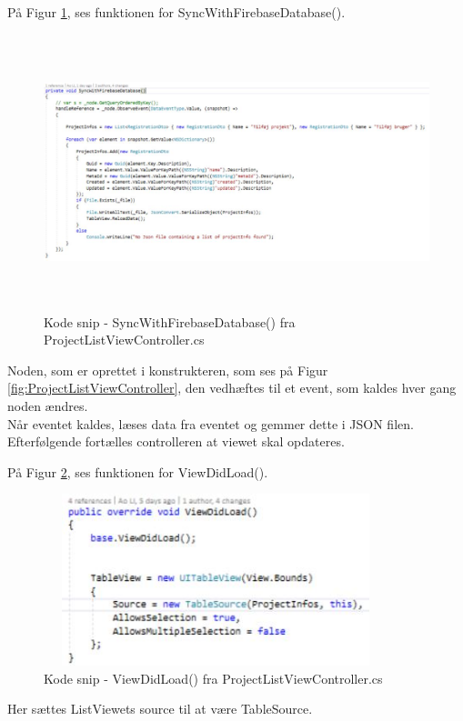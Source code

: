 På Figur \ref{fig:SyncWithDB}, ses funktionen for SyncWithFirebaseDatabase().
\begin{figure}[H] %
	\centering
	\includegraphics[height=8cm, width=15cm]{../ArkitekturDesign/Design/ProjectList/SyncWithDB}
	\caption{Kode snip - SyncWithFirebaseDatabase() fra ProjectListViewController.cs}
	\label{fig:SyncWithDB}
\end{figure}
Noden, som er oprettet i konstrukteren, som ses på Figur \ref{fig:ProjectListViewController}, den vedhæftes til et event, som kaldes hver gang noden ændres. \\
Når eventet kaldes, læses data fra eventet og gemmer dette i JSON filen. Efterfølgende fortælles controlleren at viewet skal opdateres.

På Figur \ref{fig:ViewDidLoad}, ses funktionen for ViewDidLoad().
\begin{figure}[H] %
	\centering
	\includegraphics[height=5cm, width=10cm]{../ArkitekturDesign/Design/ProjectList/ViewDidLoad}
	\caption{Kode snip - ViewDidLoad() fra ProjectListViewController.cs}
	\label{fig:ViewDidLoad}
\end{figure}
Her sættes ListViewets source til at være TableSource.

\clearpage

